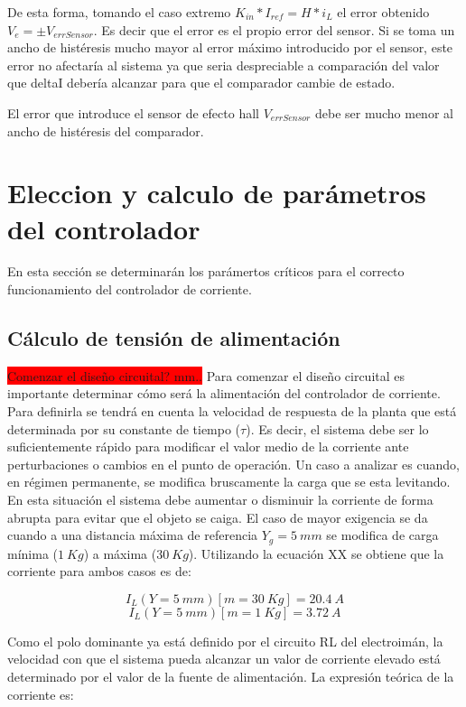 De esta forma, tomando el  caso extremo $K_{in}*I_{ref}=H*i_{L}$ el error obtenido $V_{e}=\pm V_{errSensor}$.
Es decir que el error es el propio error del sensor. Si se toma un ancho de histéresis mucho mayor al error máximo introducido por el sensor, este error no afectaría al sistema ya que seria despreciable a comparación del valor que deltaI debería alcanzar para que el comparador cambie de estado.

El error que introduce el sensor de efecto hall $V_{errSensor}$ debe ser mucho menor al ancho de histéresis del comparador.


\section{Eleccion y calculo de parámetros del controlador}
En esta sección se determinarán los parámertos críticos para el correcto funcionamiento del controlador de corriente.
\subsection{Cálculo de tensión de alimentación}
\colorbox{red}{Comenzar el diseño circuital? mm..}
Para comenzar el diseño circuital es importante determinar cómo será la alimentación del controlador de corriente. Para definirla se tendrá en cuenta la velocidad de respuesta de la planta que está determinada por su constante de tiempo ($\tau$). Es decir, el sistema debe ser lo suficientemente rápido para modificar el valor medio de la corriente ante perturbaciones o cambios en el punto de operación. Un caso a analizar es cuando, en régimen permanente, se modifica bruscamente la carga que se esta levitando. En esta situación el sistema debe aumentar o disminuir la corriente de forma abrupta para evitar que el objeto se caiga. El caso de mayor exigencia se da cuando a una distancia máxima de referencia $Y_g=5\:mm$ se modifica de carga mínima ($1\:Kg$) a máxima ($30\:Kg$). Utilizando la ecuación XX se obtiene que la corriente para ambos casos es de:

\begin{equation}
	I_L(Y=5\:mm)[m=30\:Kg]=20.4\:A 
\end{equation}
\begin{equation}
	I_L(Y=5\:mm)[m=1\:Kg]=3.72\:A
\end{equation}

Como el polo dominante ya está definido por el circuito RL del electroimán, la velocidad con que el sistema pueda alcanzar un valor de corriente elevado está determinado por el valor de la fuente de alimentación. La expresión teórica de la corriente es: 


